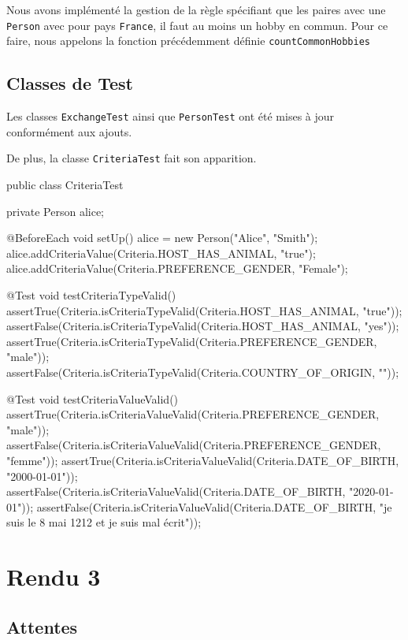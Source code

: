 \documentclass{mytex}
\begin{document}
Nous avons implémenté la gestion de la règle spécifiant que les paires avec une \texttt{Person} avec pour pays \texttt{France}, il faut au moins un hobby en commun. Pour ce faire, nous appelons la fonction précédemment définie \texttt{countCommonHobbies}

\subsection{Classes de Test}

Les classes \texttt{ExchangeTest} ainsi que \texttt{PersonTest} ont été mises à jour conformément aux ajouts.

De plus, la classe \texttt{CriteriaTest} fait son apparition.

\begin{codebox}
public class CriteriaTest {
	
	private Person alice;
	
	@BeforeEach
	void setUp() {
		alice = new Person("Alice", "Smith");
		alice.addCriteriaValue(Criteria.HOST_HAS_ANIMAL, "true");
		alice.addCriteriaValue(Criteria.PREFERENCE_GENDER, "Female");
	}
	
	@Test
	void testCriteriaTypeValid() {
		assertTrue(Criteria.isCriteriaTypeValid(Criteria.HOST_HAS_ANIMAL, "true"));
		assertFalse(Criteria.isCriteriaTypeValid(Criteria.HOST_HAS_ANIMAL, "yes"));
		assertTrue(Criteria.isCriteriaTypeValid(Criteria.PREFERENCE_GENDER, "male"));
		assertFalse(Criteria.isCriteriaTypeValid(Criteria.COUNTRY_OF_ORIGIN, ""));
	}
	
	@Test
	void testCriteriaValueValid() {
		assertTrue(Criteria.isCriteriaValueValid(Criteria.PREFERENCE_GENDER, "male"));
		assertFalse(Criteria.isCriteriaValueValid(Criteria.PREFERENCE_GENDER, "femme"));
		assertTrue(Criteria.isCriteriaValueValid(Criteria.DATE_OF_BIRTH, "2000-01-01"));
		assertFalse(Criteria.isCriteriaValueValid(Criteria.DATE_OF_BIRTH, "2020-01-01"));
		assertFalse(Criteria.isCriteriaValueValid(Criteria.DATE_OF_BIRTH, "je suis le 8 mai 1212 et je suis mal écrit"));
	}
}	
\end{codebox}

\section{Rendu 3}

\subsection{Attentes}
\end{document}
